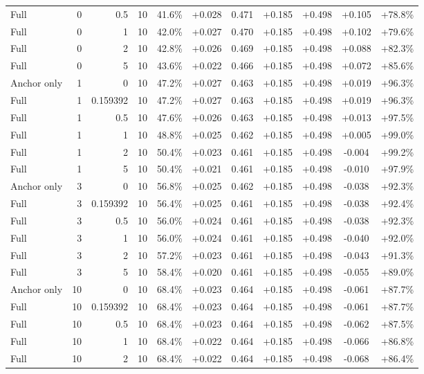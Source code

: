 \begin{table}[htbp]
\begin{tabular}{lrrrccccccc}
Full & 0 & 0.5 & 10 & 41.6\% & +0.028 & 0.471 & +0.185 & +0.498 & +0.105 & +78.8\% \\
Full & 0 & 1 & 10 & 42.0\% & +0.027 & 0.470 & +0.185 & +0.498 & +0.102 & +79.6\% \\
Full & 0 & 2 & 10 & 42.8\% & +0.026 & 0.469 & +0.185 & +0.498 & +0.088 & +82.3\% \\
Full & 0 & 5 & 10 & 43.6\% & +0.022 & 0.466 & +0.185 & +0.498 & +0.072 & +85.6\% \\
Anchor only & 1 & 0 & 10 & 47.2\% & +0.027 & 0.463 & +0.185 & +0.498 & +0.019 & +96.3\% \\
Full & 1 & 0.159392 & 10 & 47.2\% & +0.027 & 0.463 & +0.185 & +0.498 & +0.019 & +96.3\% \\
Full & 1 & 0.5 & 10 & 47.6\% & +0.026 & 0.463 & +0.185 & +0.498 & +0.013 & +97.5\% \\
Full & 1 & 1 & 10 & 48.8\% & +0.025 & 0.462 & +0.185 & +0.498 & +0.005 & +99.0\% \\
Full & 1 & 2 & 10 & 50.4\% & +0.023 & 0.461 & +0.185 & +0.498 & -0.004 & +99.2\% \\
Full & 1 & 5 & 10 & 50.4\% & +0.021 & 0.461 & +0.185 & +0.498 & -0.010 & +97.9\% \\
Anchor only & 3 & 0 & 10 & 56.8\% & +0.025 & 0.462 & +0.185 & +0.498 & -0.038 & +92.3\% \\
Full & 3 & 0.159392 & 10 & 56.4\% & +0.025 & 0.461 & +0.185 & +0.498 & -0.038 & +92.4\% \\
Full & 3 & 0.5 & 10 & 56.0\% & +0.024 & 0.461 & +0.185 & +0.498 & -0.038 & +92.3\% \\
Full & 3 & 1 & 10 & 56.0\% & +0.024 & 0.461 & +0.185 & +0.498 & -0.040 & +92.0\% \\
Full & 3 & 2 & 10 & 57.2\% & +0.023 & 0.461 & +0.185 & +0.498 & -0.043 & +91.3\% \\
Full & 3 & 5 & 10 & 58.4\% & +0.020 & 0.461 & +0.185 & +0.498 & -0.055 & +89.0\% \\
Anchor only & 10 & 0 & 10 & 68.4\% & +0.023 & 0.464 & +0.185 & +0.498 & -0.061 & +87.7\% \\
Full & 10 & 0.159392 & 10 & 68.4\% & +0.023 & 0.464 & +0.185 & +0.498 & -0.061 & +87.7\% \\
Full & 10 & 0.5 & 10 & 68.4\% & +0.023 & 0.464 & +0.185 & +0.498 & -0.062 & +87.5\% \\
Full & 10 & 1 & 10 & 68.4\% & +0.022 & 0.464 & +0.185 & +0.498 & -0.066 & +86.8\% \\
Full & 10 & 2 & 10 & 68.4\% & +0.022 & 0.464 & +0.185 & +0.498 & -0.068 & +86.4\% \\

\end{tabular}
\end{table}
